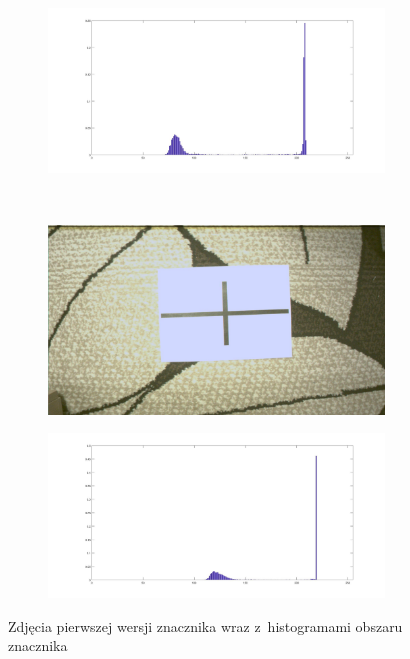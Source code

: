 \begin{figure}
\begin{subfigure}{0.4\textwidth}
 		\caption{}
 		\label{fig:osw2}
 	\end{subfigure}
 	\begin{subfigure}{0.55\textwidth}
 		\centering
 		\includegraphics[width=0.98\textwidth]{bw_hist2.jpg}
 		\caption{}
 		\label{fig:bw_hist2}
 	\end{subfigure}\\
 	\begin{subfigure}{0.4\textwidth}
 		\centering
 		\includegraphics[width=0.98\textwidth]{rgb_jasny.jpg}
 		\caption{}
 		\label{fig:osw3}
 	\end{subfigure}
 	\begin{subfigure}{0.55\textwidth}
 		\centering
 		\includegraphics[width=0.98\textwidth]{bw_hist3.jpg}
 		\caption{}
 		\label{fig:bw_hist3}
 	\end{subfigure}
 	\caption{Zdjęcia pierwszej wersji znacznika wraz z~histogramami obszaru znacznika}
 	\label{fig:zdjecia_wejsciowe}
 \end{figure}


